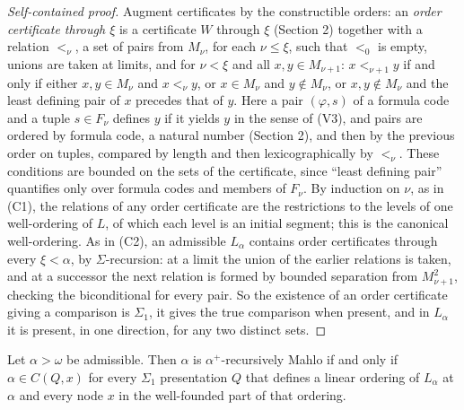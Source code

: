 \documentclass[11pt]{article}
\begin{document}
\begin{proof}[Self-contained proof]
Augment certificates by the constructible orders: an \emph{order
certificate through $\xi$} is a certificate $W$ through $\xi$ (Section 2) together with a relation $<_\nu$, a set of
pairs from $M_\nu$, for each $\nu \le \xi$, such that $<_0$ is empty, unions are taken at limits, and for $\nu < \xi$
and all $x, y \in M_{\nu+1}$:
$x <_{\nu+1} y$ if and only if either $x, y \in M_\nu$ and $x <_\nu y$, or $x \in M_\nu$ and $y \notin M_\nu$, or
$x, y \notin M_\nu$ and the least defining pair of $x$ precedes that of $y$. Here a pair $(\varphi, s)$ of a
formula code and a tuple $s \in F_\nu$ defines $y$ if it yields $y$ in the sense of (V3), and pairs are ordered by
formula code, a natural number (Section 2), and then by the previous order on tuples, compared by length and then
lexicographically by $<_\nu$. These conditions are bounded on the sets of the certificate,
since ``least defining pair'' quantifies only over formula codes and members of $F_\nu$. By induction on $\nu$, as in
(C1), the relations of any order certificate are the restrictions to the levels of one well-ordering of $L$, of which
each level is an initial segment; this is the canonical well-ordering. As in (C2), an admissible $L_{\alpha}$ contains
order certificates through every $\xi < \alpha$, by $\Sigma$-recursion: at a limit the union of the earlier
relations is taken, and at a successor the next relation is formed by bounded separation from $M_{\nu+1}^2$,
checking the biconditional for every pair. So the existence of an order certificate
giving a comparison is $\Sigma_1$, it gives the true comparison when present, and in $L_{\alpha}$ it is present, in
one direction, for any two distinct sets.
\end{proof}

\begin{statement} Let $\alpha > \omega$ be admissible. Then $\alpha$ is $\alpha^+$-recursively Mahlo if and only if
$\alpha \in C(Q, x)$ for every $\Sigma_1$ presentation $Q$ that defines a linear ordering of $L_{\alpha}$ at $\alpha$
and every node $x$ in the well-founded part of that ordering.
\end{statement}
\end{document}
